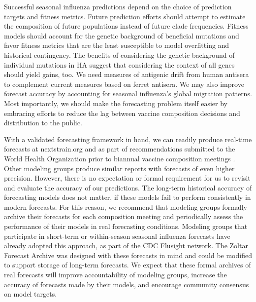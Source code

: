 Successful seasonal influenza predictions depend on the choice of prediction targets and fitness metrics.
Future prediction efforts should attempt to estimate the composition of future populations instead of future clade frequencies.
Fitness models should account for the genetic background of beneficial mutations and favor fitness metrics that are the least susceptible to model overfitting and historical contingency.
The benefits of considering the genetic background of individual mutations in HA suggest that considering the context of all genes should yield gains, too.
We need measures of antigenic drift from human antisera to complement current measures based on ferret antisera.
We may also improve forecast accuracy by accounting for seasonal influenza's global migration patterns.
Most importantly, we should make the forecasting problem itself easier by embracing efforts to reduce the lag between vaccine composition decisions and distribution to the public.

With a validated forecasting framework in hand, we can readily produce real-time forecasts at nextstrain.org and as part of recommendations submitted to the World Health Organization prior to biannual vaccine composition meetings \cite{Bedford780627}.
Other modeling groups produce similar reports with forecasts of even higher precision.
However, there is no expectation or formal requirement for us to revisit and evaluate the accuracy of our predictions.
The long-term historical accuracy of forecasting models does not matter, if these models fail to perform consistently in modern forecasts.
For this reason, we recommend that modeling groups formally archive their forecasts for each composition meeting and periodically assess the performance of their models in real forecasting conditions.
Modeling groups that participate in short-term or within-season seasonal influenza forecasts have already adopted this approach, as part of the CDC Flusight network.
The Zoltar Forecast Archive \citep{reich2020zoltar} was designed with these forecasts in mind and could be modified to support storage of long-term forecasts.
We expect that these formal archives of real forecasts will improve accountability of modeling groups, increase the accuracy of forecasts made by their models, and encourage community consensus on model targets.
